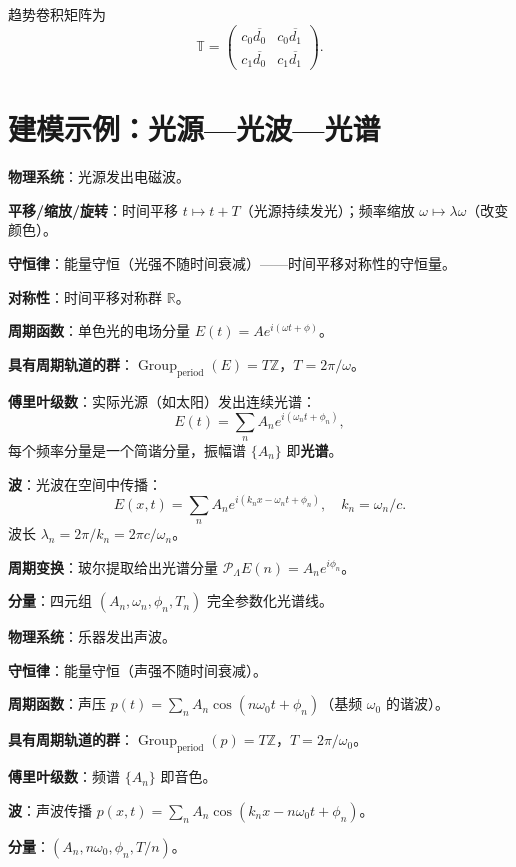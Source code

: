 \begin{example}\label{ex:period_two_periodic_convolution}
趋势卷积矩阵为
\[
\mathbb{T} = \begin{pmatrix} c_0\overline{d_0} & c_0\overline{d_1} \\ c_1\overline{d_0} & c_1\overline{d_1} \end{pmatrix}.
\]
\end{example}

\section{建模示例：光源—光波—光谱}

\begin{example}[光源—光波—光谱的完整建模链条]\label{ex:light_source_modelling}
\textbf{物理系统}：光源发出电磁波。

\textbf{平移/缩放/旋转}：时间平移 $t \mapsto t+T$（光源持续发光）；频率缩放 $\omega \mapsto \lambda\omega$（改变颜色）。

\textbf{守恒律}：能量守恒（光强不随时间衰减）——时间平移对称性的守恒量。

\textbf{对称性}：时间平移对称群 $\mathbb{R}$。

\textbf{周期函数}：单色光的电场分量 $E(t) = A e^{i(\omega t + \phi)}$。

\textbf{具有周期轨道的群}：$\operatorname{Group}_{\mathrm{period}}(E) = T\mathbb{Z}$，$T = 2\pi/\omega$。

\textbf{傅里叶级数}：实际光源（如太阳）发出连续光谱：
\[
E(t) = \sum_{n} A_n e^{i(\omega_n t + \phi_n)},
\]
每个频率分量是一个简谐分量，振幅谱 $\{A_n\}$ 即\textbf{光谱}。

\textbf{波}：光波在空间中传播：
\[
E(x,t) = \sum_n A_n e^{i(k_n x - \omega_n t + \phi_n)}, \quad k_n = \omega_n / c.
\]
波长 $\lambda_n = 2\pi/k_n = 2\pi c/\omega_n$。

\textbf{周期变换}：玻尔提取给出光谱分量 $\mathcal{P}_\Lambda E(n) = A_n e^{i\phi_n}$。

\textbf{分量}：四元组 $(A_n, \omega_n, \phi_n, T_n)$ 完全参数化光谱线。
\end{example}

\begin{example}[声音—声波—频谱]\label{ex:sound_modelling}
\textbf{物理系统}：乐器发出声波。

\textbf{守恒律}：能量守恒（声强不随时间衰减）。

\textbf{周期函数}：声压 $p(t) = \sum_n A_n \cos(n\omega_0 t + \phi_n)$（基频 $\omega_0$ 的谐波）。

\textbf{具有周期轨道的群}：$\operatorname{Group}_{\mathrm{period}}(p) = T\mathbb{Z}$，$T = 2\pi/\omega_0$。

\textbf{傅里叶级数}：频谱 $\{A_n\}$ 即音色。

\textbf{波}：声波传播 $p(x,t) = \sum_n A_n \cos(k_n x - n\omega_0 t + \phi_n)$。

\textbf{分量}：$(A_n, n\omega_0, \phi_n, T/n)$。
\end{example}

